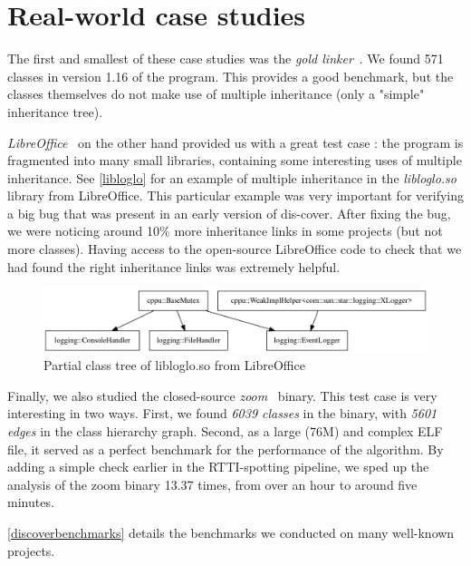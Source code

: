 \documentclass[a4paper,11pt,oneside]{report}
\begin{document}
\section{Real-world case studies}

The first and smallest of these case studies was the \emph{gold 
linker}~\cite{gold}.
We found 571 classes in version 1.16 of the program.
This provides a good benchmark, but the classes themselves do not make use of 
multiple inheritance (only a "simple" inheritance tree).

\emph{LibreOffice}~\cite{libreoffice} on the other hand provided us with a 
great test case :
the program is fragmented into many small libraries, containing some 
interesting uses of multiple inheritance.
See \autoref{libloglo} for an example of multiple inheritance in the 
\emph{libloglo.so} library from LibreOffice.
This particular example was very important for verifying a big bug that was 
present in an early version of dis-cover.
After fixing the bug, we were noticing around 10\% more inheritance links in 
some projects (but not more classes).
Having access to the open-source LibreOffice code to check that we had found 
the right inheritance links was extremely helpful.

\begin{figure}

\includegraphics[width=16cm]{libloglo_partial.png}
\caption{Partial class tree of libloglo.so from LibreOffice}
\label{libloglo}

\end{figure}

Finally, we also studied the closed-source \emph{zoom}~\cite{zoom} binary.
This test case is very interesting in two ways.
First, we found \emph{6039 classes} in the binary, with \emph{5601 edges}
in the class hierarchy graph.
Second, as a large (76M) and complex ELF file, it served as a perfect benchmark 
for the performance of the algorithm.
By adding a simple check earlier in the RTTI-spotting pipeline, we sped up the
analysis of the zoom binary 13.37 times, from over an hour to around five
minutes.

\autoref{discoverbenchmarks} details the benchmarks we conducted on many 
well-known projects.
\end{document}
